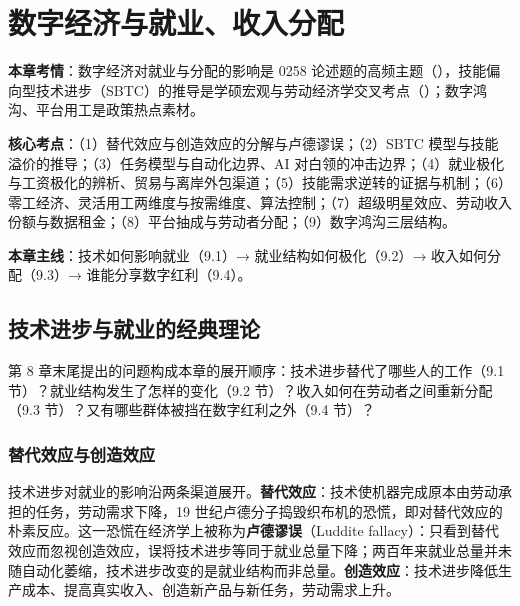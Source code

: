 \chapter{数字经济与就业、收入分配}

\begin{examguide}
\textbf{本章考情}：数字经济对就业与分配的影响是 0258 论述题的高频主题（），技能偏向型技术进步（SBTC）的推导是学硕宏观与劳动经济学交叉考点（）；数字鸿沟、平台用工是政策热点素材。

\textbf{核心考点}：（1）替代效应与创造效应的分解与卢德谬误；（2）SBTC 模型与技能溢价的推导；（3）任务模型与自动化边界、AI 对白领的冲击边界；（4）就业极化与工资极化的辨析、贸易与离岸外包渠道；（5）技能需求逆转的证据与机制；（6）零工经济、灵活用工两维度与按需维度、算法控制；（7）超级明星效应、劳动收入份额与数据租金；（8）平台抽成与劳动者分配；（9）数字鸿沟三层结构。

\textbf{本章主线}：技术如何影响就业（9.1）→ 就业结构如何极化（9.2）→ 收入如何分配（9.3）→ 谁能分享数字红利（9.4）。
\end{examguide}

\section{技术进步与就业的经典理论}

第 8 章末尾提出的问题构成本章的展开顺序：技术进步替代了哪些人的工作（9.1 节）？就业结构发生了怎样的变化（9.2 节）？收入如何在劳动者之间重新分配（9.3 节）？又有哪些群体被挡在数字红利之外（9.4 节）？

\subsection{替代效应与创造效应}

技术进步对就业的影响沿两条渠道展开。\textbf{替代效应}：技术使机器完成原本由劳动承担的任务，劳动需求下降，19 世纪卢德分子捣毁织布机的恐慌，即对替代效应的朴素反应。这一恐慌在经济学上被称为\textbf{卢德谬误}（Luddite fallacy）：只看到替代效应而忽视创造效应，误将技术进步等同于就业总量下降；两百年来就业总量并未随自动化萎缩，技术进步改变的是就业结构而非总量。\textbf{创造效应}：技术进步降低生产成本、提高真实收入、创造新产品与新任务，劳动需求上升。

